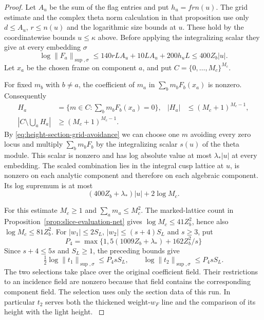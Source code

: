 \begin{proof}
Let \(A_u\) be the sum of the flag entries and put \(h_u=frn(u)\).
The grid estimate and the complex theta norm calculation in that
proposition use only \(d\le A_u\), \(r\le n(u)\) and the logarithmic
size bounds at \(u\). These hold by the coordinatewise bounds
\(u\le\kappa\) above. Before applying the integralizing scalar they give
at every embedding \(\sigma\)
\[
 \log\|F_a\|_{\sup,\sigma}
 \le 140rL A_u+10L A_u+200h_uL
 \le 400 Z_b |u| .
\]
Let \(x_a\) be the chosen frame on component \(a\), and put
\(C=\{0,\ldots,M_c\}^{M_c}\).

For fixed \(m_b\) with \(b\ne a\),
the coefficient of \(m_a\) in \(\sum_b m_bF_b(x_a)\) is nonzero.
Consequently
\begin{equation}\label{eq:height-section-grid-avoidance}
 \begin{aligned}
 H_a&=\{m\in C:\textstyle\sum_b m_bF_b(x_a)=0\},&
       |H_a|&\le(M_c+1)^{M_c-1},\\
 \left|C\setminus\bigcup_a H_a\right|
     &\ge (M_c+1)^{M_c-1}.&&
 \end{aligned}
\end{equation}
By \eqref{eq:height-section-grid-avoidance} we can choose one \(m\)
avoiding every zero locus and multiply \(\sum_b m_b F_b\)
by the integralizing scalar \(s(u)\) of the theta module.
This scalar is nonzero and has log
absolute value at most \(\lambda_*|u|\) at every embedding.
The scaled combination lies in the integral cusp lattice at \(u\),
is nonzero on each analytic component and therefore on each
algebraic component. Its log supremum is at most
\[
               (400Z_b+\lambda_*)|u|+2\log M_c .
\]

For this estimate \(M_c\ge1\) and \(\sum_a m_a\le M_c^2\).
The marked-lattice count in Proposition~\ref{prop:slice-evaluation-net}
gives \(\log M_c\le41Z_b^2\), hence also \(\log M_c\le81Z_b^2\).
For \(|w_1|\le2S_L\), \(|w_2|\le(s+4)S_L\) and \(s\ge3\), put
\[
       P_4=\max\{1,5(1009Z_b+\lambda_*)+162 Z_b^2/s\}
\]
Since \(s+4\le5s\) and \(S_L\ge1\), the preceding bounds give
\[
 \tfrac12\log\|t_1\|_{\sup,\sigma}\le P_4 s S_L,\qquad
           \log\|t_2\|_{\sup,\sigma}\le P_4 s S_L .
\]
The two selections take place over the original coefficient field.
Their restrictions to an incidence field are nonzero because
that field contains the corresponding component field. The
selection uses only the section data of this run. In particular
\(t_2\) serves both the thickened weight-\(w_F\) line and the
comparison of its height with the light height.
\label{cor:selected-height-sections-3}
\end{proof}
